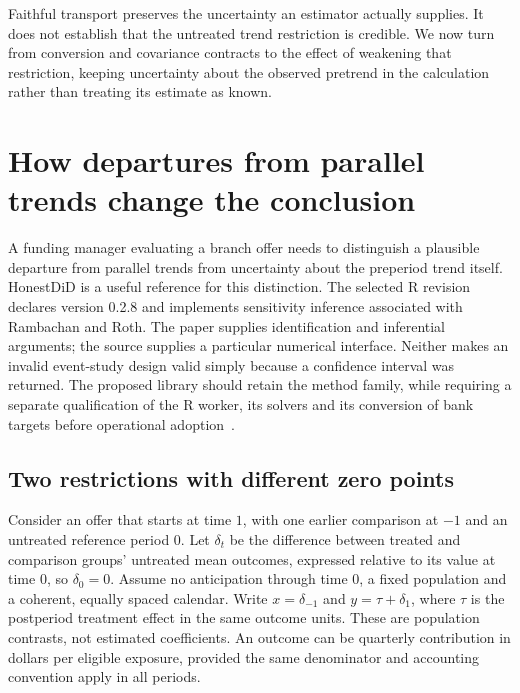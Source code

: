 \par
Faithful transport preserves the uncertainty an estimator actually supplies.
It does not establish that the untreated trend restriction is credible. We
now turn from conversion and covariance contracts to the effect of weakening
that restriction, keeping uncertainty about the observed pretrend in the
calculation rather than treating its estimate as known.

\section{How departures from parallel trends change the conclusion}
\label{exec22:hd-scope}

A funding manager evaluating a branch offer needs to distinguish a plausible
departure from parallel trends from uncertainty about the preperiod trend itself.
HonestDiD is a useful reference for this distinction. The selected R revision
declares version 0.2.8 and implements sensitivity inference associated with
Rambachan and Roth. The paper supplies identification and inferential arguments;
the source supplies a particular numerical interface. Neither makes an invalid
event-study design valid simply because a confidence interval was returned.
The proposed library should retain the method family, while requiring a separate
qualification of the R worker, its solvers and its conversion of bank targets
before operational adoption~\citep{rambachan2023,exec22_honestdid_engine}.

\subsection{Two restrictions with different zero points}
\label{exec22:hd-restrictions}

Consider an offer that starts at time $1$, with one earlier comparison at $-1$
and an untreated reference period $0$. Let $\delta_t$ be the difference between
treated and comparison groups' untreated mean outcomes, expressed relative to
its value at time $0$, so $\delta_0=0$. Assume no anticipation through time $0$,
a fixed population and a coherent, equally spaced calendar. Write $x=\delta_{-1}$
and $y=\tau+\delta_1$, where $\tau$ is the postperiod treatment effect in the same
outcome units. These are population contrasts, not estimated coefficients.
An outcome can be quarterly contribution in dollars per eligible exposure,
provided the same denominator and accounting convention apply in all periods.

